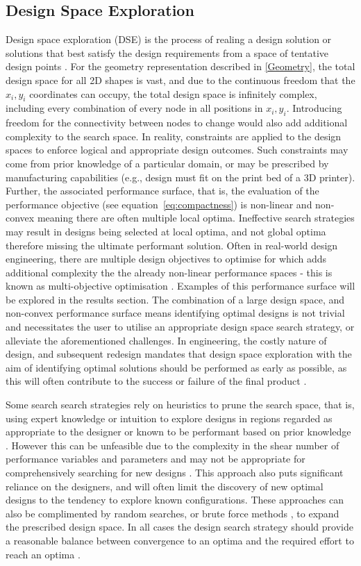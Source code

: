 \documentclass{article}
\begin{document}
\subsection{Design Space Exploration}
Design space exploration (DSE) is the process of realing a design solution or solutions that best satisfy the design requirements from a space of tentative design points \citep{CARDOSO2017255}. For the geometry representation described in \ref{Geometry}, the total design space for all 2D shapes is vast, and due to the continuous freedom that the $x_i,y_i$ coordinates can occupy, the total design space is infinitely complex, including every combination of every node in all positions in $x_i,y_i$. Introducing freedom for the connectivity between nodes to change would also add additional complexity to the search space. In reality, constraints are applied to the design spaces to enforce logical and appropriate design outcomes. Such constraints may come from prior knowledge of a particular domain, or may be prescribed by manufacturing capabilities (e.g., design must fit on the print bed of a 3D printer). Further, the associated performance surface, that is, the evaluation of the performance objective (see equation~\ref{eq:compactness}) is non-linear and non-convex meaning there are often multiple local optima. Ineffective search strategies may result in designs being selected at local optima, and not global optima therefore missing the ultimate performant solution.
Often in real-world design engineering, there are multiple design objectives to optimise for which adds additional complexity the the already non-linear performance spaces - this is known as multi-objective optimisation \citep{Pimentel2022}.  Examples of this performance surface will be explored in the results section. The combination of a large design space, and non-convex performance surface means identifying optimal designs is not trivial and necessitates the user to utilise an appropriate design space search strategy, or alleviate the aforementioned challenges. In engineering, the costly nature of design, and subsequent redesign mandates that design space exploration with the aim of identifying optimal solutions should be performed as early as possible, as this will often contribute to the success or failure of the final product \citep{Pimentel2022}. 

Some search search strategies rely on heuristics to prune the search space, that is, using expert knowledge or intuition to explore designs in regions regarded as appropriate to the designer or known to be performant based on prior knowledge \citep{Nardi2018}. However this can be unfeasible due to the complexity in the shear number of performance variables and parameters and may not be appropriate for comprehensively searching for new designs \citep{Zheng2023}. This approach also puts significant reliance on the designers, and will often limit the discovery of new optimal designs to the tendency to explore known configurations. These approaches can also be complimented by random searches, or brute force methods \citep{Huang2022}, to expand the prescribed design space. In all cases the design search strategy  should provide a reasonable balance between convergence to an optima and the required effort to reach an optima \citep{Pimentel2022}.
\end{document}
